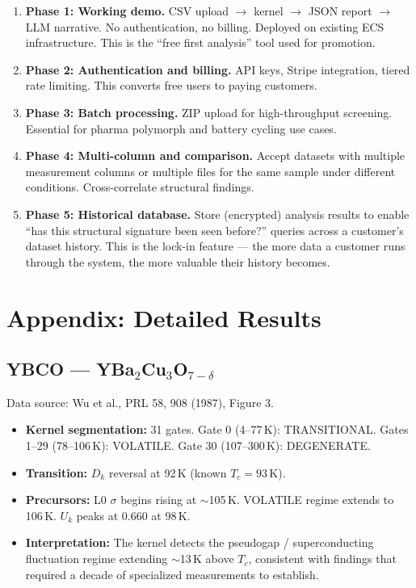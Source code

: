 \documentclass[11pt,letterpaper]{article}
\begin{document}
\begin{enumerate}
  \item \textbf{Phase 1: Working demo.} CSV upload $\to$ kernel
    $\to$ JSON report $\to$ LLM narrative. No authentication, no
    billing. Deployed on existing ECS infrastructure. This is the
    ``free first analysis'' tool used for promotion.

  \item \textbf{Phase 2: Authentication and billing.} API keys,
    Stripe integration, tiered rate limiting. This converts free
    users to paying customers.

  \item \textbf{Phase 3: Batch processing.} ZIP upload for
    high-throughput screening. Essential for pharma polymorph
    and battery cycling use cases.

  \item \textbf{Phase 4: Multi-column and comparison.} Accept
    datasets with multiple measurement columns or multiple files
    for the same sample under different conditions. Cross-correlate
    structural findings.

  \item \textbf{Phase 5: Historical database.} Store (encrypted)
    analysis results to enable ``has this structural signature been
    seen before?'' queries across a customer's dataset history.
    This is the lock-in feature --- the more data a customer runs
    through the system, the more valuable their history becomes.
\end{enumerate}

\section{Appendix: Detailed Results}

\subsection{YBCO --- YBa$_2$Cu$_3$O$_{7-\delta}$}

Data source: Wu et al., PRL 58, 908 (1987), Figure 3.

\begin{itemize}
  \item \textbf{Kernel segmentation:} 31 gates.
    Gate 0 (4--77\,K): TRANSITIONAL. Gates 1--29 (78--106\,K): VOLATILE.
    Gate 30 (107--300\,K): DEGENERATE.
  \item \textbf{Transition:} $D_k$ reversal at 92\,K (known $T_c = 93$\,K).
  \item \textbf{Precursors:} L0 $\sigma$ begins rising at $\sim$105\,K.
    VOLATILE regime extends to 106\,K. $U_k$ peaks at 0.660 at 98\,K.
  \item \textbf{Interpretation:} The kernel detects the pseudogap /
    superconducting fluctuation regime extending $\sim$13\,K above $T_c$,
    consistent with findings that required a decade of specialized
    measurements to establish.
\end{itemize}
\end{document}

